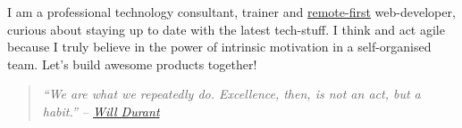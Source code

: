 \documentclass[9pt]{developercv} %
\begin{document}
\vspace{0.5cm}



\begin{minipage}[t]{0.4\textwidth} %
	\vspace{-\baselineskip} %
  I am a professional technology consultant, trainer and \href{https://www.remoteonly.org/}{\uline{remote-first}} web-developer, curious
  about staying up to date with the latest tech-stuff.
  I think and act agile because I truly believe in the power of  intrinsic motivation in a self-organised team.
  Let's build awesome products together!
  \begin{quotation} %
    \itshape{``We are what we repeatedly do. Excellence, then, is not an act, but a habit.''} -- 
    \href{https://medium.com/the-mission/my-favourite-quote-of-all-time-is-a-misattribution-66356f22843d}{Will Durant}\\
  \end{quotation}
\end{minipage}
\hfill %
\begin{minipage}[t]{0.5\textwidth} %
	\vspace{-\baselineskip} %
	\begin{barchart}{5.5}
	\end{barchart}
\end{minipage}

\begin{center}
\end{center}


\end{document}
